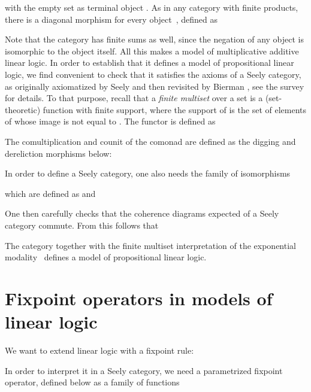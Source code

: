 \documentclass[runningheads,a4paper]{llncs}
\begin{document}
with the empty set as terminal object .
As in any category with finite products, there is a diagonal morphism 
for every object~, defined
as



Note that the category  has finite sums as well, since the negation  
of any object  is isomorphic to the object  itself.
All this makes  a model of multiplicative additive linear logic.
In order to establish that it defines a model of propositional linear logic, 
we find convenient to check that it satisfies the axioms
of a Seely category, as originally axiomatized by Seely \cite{seely} 
and then revisited by Bierman \cite{bierman}, see the survey \cite{models-of-linear-logic} for details.
To that purpose, recall that a \emph{finite multiset} over a set  
is a (set-theoretic) function  with finite support,
where the support of  is the set of elements of  whose image is not equal to .
The functor  is defined as



\noindent
The comultiplication and counit of the comonad are defined as the digging and dereliction morphisms below:



\noindent
In order to define a Seely category, one also needs the family of isomorphisms



\noindent
which are defined as  and



\noindent
One then carefully checks that the coherence diagrams expected of a Seely category commute.
From this follows that 

\begin{property}
The category  together with the finite multiset interpretation
of the exponential modality~ defines a model of propositional linear logic.
\end{property}



\section{Fixpoint operators in models of linear logic}\label{section/fixpoints}
We want to extend linear logic with a fixpoint rule:



\noindent
In order to interpret it in a Seely category, we need a parametrized fixpoint operator,
defined below as a family of functions
\end{document}
